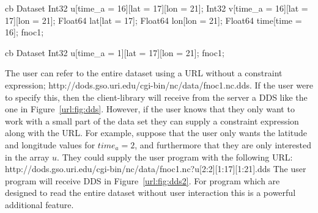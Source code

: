 \begin{code}{cb}
    Dataset {
        Int32 u[time_a = 16][lat = 17][lon = 21];
        Int32 v[time_a = 16][lat = 17][lon = 21];
        Float64 lat[lat = 17];
        Float64 lon[lon = 21];
        Float64 time[time = 16];
    } fnoc1;
\end{code}

\begin{code}{cb}
    Dataset {
        Int32 u[time_a = 1][lat = 17][lon = 21];
    } fnoc1;
\end{code}

The user can refer to the entire dataset using a URL without a constraint
expression;
{http://dods.gso.uri.edu/cgi-bin/nc/data/fnoc1.nc.dds}. If the user were to
specify this, then the client-library will receive from the server a DDS like
the one in Figure~\ref{url:fig:dds}. However, if the user knows that they
only want to work with a small part of the data set they can supply a
constraint expression along with the URL\@. For example, suppose that the
user only wants the latitude and longitude values for $time_a = 2$, and
furthermore that they are only interested in the array $u$. They could supply
the user program with the following URL:
{http://dods.gso.uri.edu/cgi-bin/nc/data/fnoc1.nc?u[2:2][1:17][1:21].dds} The
user program will receive DDS in Figure~\ref{url:fig:dds2}. For program which
are designed to read the entire dataset without user interaction this is a
powerful additional feature.


